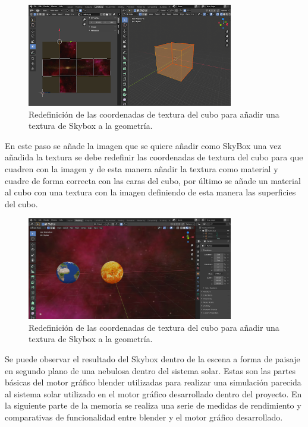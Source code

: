 \documentclass[a4paper]{book}
\begin{document}
\begin{figure}[H]
    \centering
    \includegraphics[width=9cm, keepaspectratio]{img/SkyBoxVertex.png}
    \caption{Redefinición de las coordenadas de textura del cubo para añadir una textura de Skybox a la geometría.}
    \label{SkyBoxVertex}
\end{figure}

En este paso se añade la imagen que se quiere añadir como SkyBox una vez añadida la textura se debe redefinir las coordenadas
de textura del cubo para que cuadren con la imagen y de esta manera añadir la textura como material y cuadre de forma correcta
con las caras del cubo, por último se añade un material al cubo con una textura con la imagen definiendo de esta manera las
superficies del cubo.

\begin{figure}[H]
    \centering
    \includegraphics[width=9cm, keepaspectratio]{img/SkyBoxFinal.png}
    \caption{Redefinición de las coordenadas de textura del cubo para añadir una textura de Skybox a la geometría.}
    \label{SkyBoxFinal}
\end{figure}

Se puede observar el resultado del Skybox dentro de la escena a forma de paisaje en segundo plano de una nebulosa dentro
del sistema solar. Estas son las partes básicas del motor gráfico blender utilizadas para realizar una simulación parecida
al sistema solar utilizado en el motor gráfico desarrollado dentro del proyecto. En la siguiente parte de la memoria se realiza
una serie de medidas de rendimiento y comparativas de funcionalidad entre blender y el motor gráfico desarrollado. \cite{blender:_manual}
\end{document}
